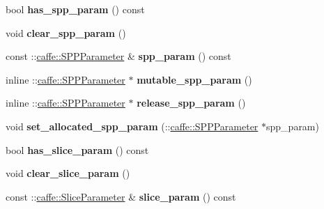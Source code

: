 \begin{DoxyCompactItemize}
bool {\bfseries has\+\_\+spp\+\_\+param} () const
\item 
\mbox{\label{classcaffe_1_1_layer_parameter_a4b1796da0022fc31577bcbf0a21ff9aa}} 
void {\bfseries clear\+\_\+spp\+\_\+param} ()
\item 
\mbox{\label{classcaffe_1_1_layer_parameter_a689e8c539fda54ecadef8266550ad9b3}} 
const \+::\mbox{\hyperlink{classcaffe_1_1_s_p_p_parameter}{caffe\+::\+S\+P\+P\+Parameter}} \& {\bfseries spp\+\_\+param} () const
\item 
\mbox{\label{classcaffe_1_1_layer_parameter_aa1a2b63ca875c4f969f6115f98fd5fb3}} 
inline \+::\mbox{\hyperlink{classcaffe_1_1_s_p_p_parameter}{caffe\+::\+S\+P\+P\+Parameter}} $\ast$ {\bfseries mutable\+\_\+spp\+\_\+param} ()
\item 
\mbox{\label{classcaffe_1_1_layer_parameter_a647916da7434ff5bf1c727ede2595e04}} 
inline \+::\mbox{\hyperlink{classcaffe_1_1_s_p_p_parameter}{caffe\+::\+S\+P\+P\+Parameter}} $\ast$ {\bfseries release\+\_\+spp\+\_\+param} ()
\item 
\mbox{\label{classcaffe_1_1_layer_parameter_a536ff5eab22a78270a40d02865f89c30}} 
void {\bfseries set\+\_\+allocated\+\_\+spp\+\_\+param} (\+::\mbox{\hyperlink{classcaffe_1_1_s_p_p_parameter}{caffe\+::\+S\+P\+P\+Parameter}} $\ast$spp\+\_\+param)
\item 
\mbox{\label{classcaffe_1_1_layer_parameter_adbb27a46d6a8a6de6f4eb8201027cbd1}} 
bool {\bfseries has\+\_\+slice\+\_\+param} () const
\item 
\mbox{\label{classcaffe_1_1_layer_parameter_a5cd0f99f5affaf0ea95a4913e1615de7}} 
void {\bfseries clear\+\_\+slice\+\_\+param} ()
\item 
\mbox{\label{classcaffe_1_1_layer_parameter_ad88265e0797b62164d6f884339092794}} 
const \+::\mbox{\hyperlink{classcaffe_1_1_slice_parameter}{caffe\+::\+Slice\+Parameter}} \& {\bfseries slice\+\_\+param} () const
\item 
\mbox{\label{classcaffe_1_1_layer_parameter_aff938ec72bc1c688eddbe12bfdcd6504}} 

\end{DoxyCompactItemize}
